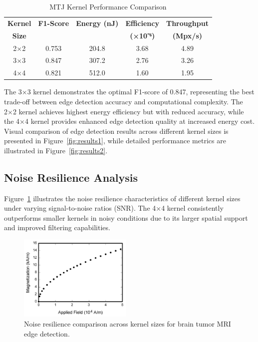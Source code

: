 \documentclass[conference]{IEEEtran}
\begin{document}
\begin{table}[htbp]
\caption{MTJ Kernel Performance Comparison}
\begin{center}
\begin{tabular}{|c|c|c|c|c|}
\hline
\textbf{Kernel} & \textbf{F1-Score} & \textbf{Energy (nJ)} & \textbf{Efficiency} & \textbf{Throughput} \\
\textbf{Size} & & & \textbf{(×10⁻⁶)} & \textbf{(Mpx/s)} \\
\hline
2×2 & 0.753 & 204.8 & 3.68 & 4.89 \\
\hline
3×3 & 0.847 & 307.2 & 2.76 & 3.26 \\
\hline
4×4 & 0.821 & 512.0 & 1.60 & 1.95 \\
\hline
\end{tabular}
\label{tab:kernel_comparison}
\end{center}
\end{table}

The 3×3 kernel demonstrates the optimal F1-score of 0.847, representing the best trade-off between edge detection accuracy and computational complexity. The 2×2 kernel achieves highest energy efficiency but with reduced accuracy, while the 4×4 kernel provides enhanced edge detection quality at increased energy cost. Visual comparison of edge detection results across different kernel sizes is presented in Figure~\ref{fig:results1}, while detailed performance metrics are illustrated in Figure~\ref{fig:results2}.

\subsection{Noise Resilience Analysis}

Figure~\ref{fig:noise_analysis} illustrates the noise resilience characteristics of different kernel sizes under varying signal-to-noise ratios (SNR). The 4×4 kernel consistently outperforms smaller kernels in noisy conditions due to its larger spatial support and improved filtering capabilities.

\begin{figure}[htbp]
\centerline{\includegraphics[width=0.48\textwidth]{fig1.png}}
\caption{Noise resilience comparison across kernel sizes for brain tumor MRI edge detection.}
\label{fig:noise_analysis}
\end{figure}
\end{document}
